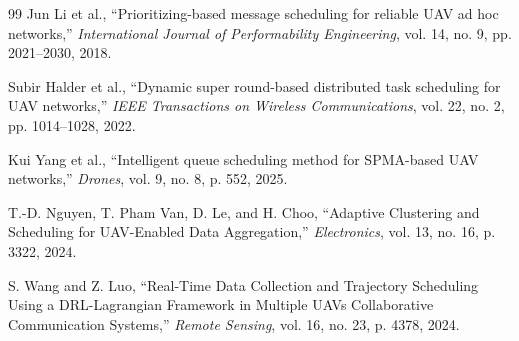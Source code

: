 \begin{thebibliography}{99}
Jun Li et al.,
``Prioritizing-based message scheduling for reliable UAV ad hoc networks,''
\textit{International Journal of Performability Engineering},
vol. 14, no. 9, pp. 2021--2030, 2018.

Subir Halder et al.,
``Dynamic super round-based distributed task scheduling for UAV networks,''
\textit{IEEE Transactions on Wireless Communications},
vol. 22, no. 2, pp. 1014--1028, 2022.

Kui Yang et al.,
``Intelligent queue scheduling method for SPMA-based UAV networks,''
\textit{Drones},
vol. 9, no. 8, p. 552, 2025.

T.-D. Nguyen, T. Pham Van, D. Le, and H. Choo,
``Adaptive Clustering and Scheduling for UAV-Enabled Data Aggregation,''
\textit{Electronics}, vol. 13, no. 16, p. 3322, 2024.

S. Wang and Z. Luo,
``Real-Time Data Collection and Trajectory Scheduling Using a DRL-Lagrangian Framework in Multiple UAVs Collaborative Communication Systems,''
\textit{Remote Sensing}, vol. 16, no. 23, p. 4378, 2024.

\end{thebibliography}